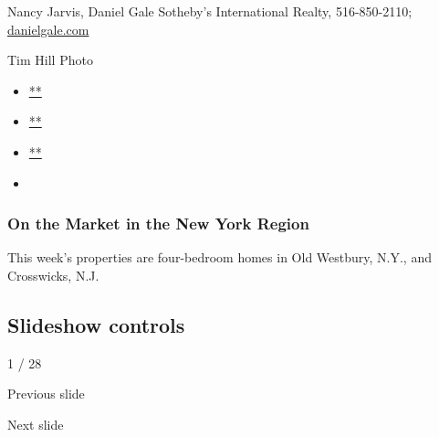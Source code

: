 Nancy Jarvis, Daniel Gale Sotheby's International Realty, 516-850-2110;
\href{https://www.nytimes3xbfgragh.onion/real-estate/usa/ny/old-westbury/homes-for-sale/6-pinewood-road/2836-96V8ZD?channel=sale\&locations\%5B\%5D=old-westbury-ny-usa\%2F6-Pinewood-Road-address}{danielgale.com}

Tim Hill Photo

\begin{itemize}
\item
  \href{https://www.facebookcorewwwi.onion/sharer.php?app_id=9869919170\&u=https\%3A\%2F\%2Fwww.nytimes3xbfgragh.onion\%2Fslideshow\%2F2020\%2F07\%2F30\%2Frealestate\%2Fon-the-market-in-the-new-york-region.html\%3Fsmid\%3Dfb-share\&name=On\%20the\%20Market\%20in\%20the\%20New\%20York\%20Region\&redirect_uri=https\%3A\%2F\%2Fwww.facebookcorewwwi.onion\%2F}{**}
\item
  \href{https://twitter.com/intent/tweet?url=https\%3A\%2F\%2Fwww.nytimes3xbfgragh.onion\%2Fslideshow\%2F2020\%2F07\%2F30\%2Frealestate\%2Fon-the-market-in-the-new-york-region.html\%3Fsmid\%3Dtw-share\&text=On\%20the\%20Market\%20in\%20the\%20New\%20York\%20Region}{**}
\item
  \href{mailto:?subject=nytimes3xbfgragh.onion\%3A\%20On\%20the\%20Market\%20in\%20the\%20New\%20York\%20Region\&body=From\%20The\%20New\%20York\%20Times\%3A\%0A\%0AOn\%20the\%20Market\%20in\%20the\%20New\%20York\%20Region\%0A\%0AThis\%20week\%E2\%80\%99s\%20properties\%20are\%20four-bedroom\%20homes\%20in\%20Old\%20Westbury\%2C\%20N.Y.\%2C\%20and\%20Crosswicks\%2C\%20N.J.\%0A\%0Ahttps\%3A\%2F\%2Fwww.nytimes3xbfgragh.onion\%2Fslideshow\%2F2020\%2F07\%2F30\%2Frealestate\%2Fon-the-market-in-the-new-york-region.html\%3Fsmid\%3Dem-share}{**}
\item
\end{itemize}

\hypertarget{on-the-market-in-the-new-york-region-1}{%
\subsubsection{On the Market in the New York
Region}\label{on-the-market-in-the-new-york-region-1}}

This week's properties are four-bedroom homes in Old Westbury, N.Y., and
Crosswicks, N.J.

\hypertarget{slideshow-controls}{%
\subsection{Slideshow controls}\label{slideshow-controls}}

1 / 28

Previous slide

Next slide
